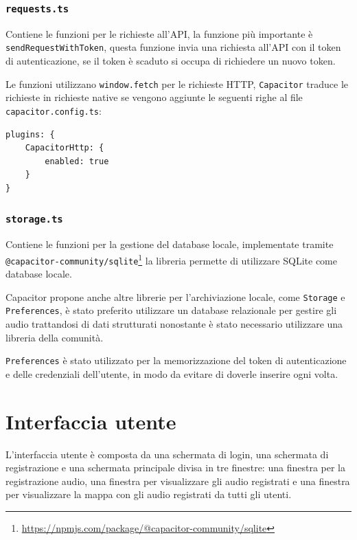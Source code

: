 \documentclass{article}
\begin{document}
\subsubsection{\texttt{requests.ts}}
Contiene le funzioni per le richieste all'API, la funzione più importante è \texttt{sendRequestWithToken}, questa funzione invia una richiesta all'API con il token di autenticazione, se il token è scaduto si occupa di richiedere un nuovo token. 

Le funzioni utilizzano \texttt{window.fetch} per le richieste HTTP, \texttt{Capacitor} traduce le richieste in richieste native se vengono aggiunte le seguenti righe al file \texttt{capacitor.config.ts}:
\begin{verbatim}
plugins: {
    CapacitorHttp: {
        enabled: true
    }
}
\end{verbatim}

\subsubsection{\texttt{storage.ts}}
Contiene le funzioni per la gestione del database locale, implementate tramite \texttt{@capacitor-community/sqlite}\footnote{\url{https://npmjs.com/package/@capacitor-community/sqlite}} la libreria permette di utilizzare SQLite come database locale. 

Capacitor propone anche altre librerie per l'archiviazione locale, come \texttt{Storage} e \texttt{Preferences}, è stato preferito utilizzare un database relazionale per gestire gli audio trattandosi di dati strutturati nonostante è stato necessario utilizzare una libreria della comunità.

\texttt{Preferences} è stato utilizzato per la memorizzazione del token di autenticazione e delle credenziali dell'utente, in modo da evitare di doverle inserire ogni volta.

\section{Interfaccia utente}
L'interfaccia utente è composta da una schermata di login, una schermata di registrazione e una schermata principale divisa in tre finestre: una finestra per la registrazione audio, una finestra per visualizzare gli audio registrati e una finestra per visualizzare la mappa con gli audio registrati da tutti gli utenti.
\end{document}
